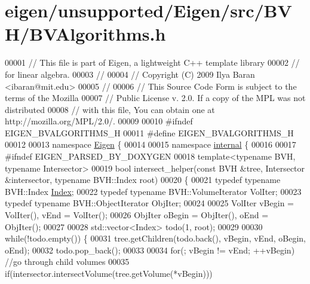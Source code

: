 \hypertarget{eigen_2unsupported_2_eigen_2src_2_b_v_h_2_b_v_algorithms_8h_source}{}\section{eigen/unsupported/\+Eigen/src/\+B\+V\+H/\+B\+V\+Algorithms.h}
\label{eigen_2unsupported_2_eigen_2src_2_b_v_h_2_b_v_algorithms_8h_source}

\begin{DoxyCode}
00001 \textcolor{comment}{// This file is part of Eigen, a lightweight C++ template library}
00002 \textcolor{comment}{// for linear algebra.}
00003 \textcolor{comment}{//}
00004 \textcolor{comment}{// Copyright (C) 2009 Ilya Baran <ibaran@mit.edu>}
00005 \textcolor{comment}{//}
00006 \textcolor{comment}{// This Source Code Form is subject to the terms of the Mozilla}
00007 \textcolor{comment}{// Public License v. 2.0. If a copy of the MPL was not distributed}
00008 \textcolor{comment}{// with this file, You can obtain one at http://mozilla.org/MPL/2.0/.}
00009 
00010 \textcolor{preprocessor}{#ifndef EIGEN\_BVALGORITHMS\_H}
00011 \textcolor{preprocessor}{#define EIGEN\_BVALGORITHMS\_H}
00012 
00013 \textcolor{keyword}{namespace }\hyperlink{namespace_eigen}{Eigen} \{ 
00014 
00015 \textcolor{keyword}{namespace }\hyperlink{namespaceinternal}{internal} \{
00016 
00017 \textcolor{preprocessor}{#ifndef EIGEN\_PARSED\_BY\_DOXYGEN}
00018 \textcolor{keyword}{template}<\textcolor{keyword}{typename} BVH, \textcolor{keyword}{typename} Intersector>
00019 \textcolor{keywordtype}{bool} intersect\_helper(\textcolor{keyword}{const} BVH &tree, Intersector &intersector, \textcolor{keyword}{typename} BVH::Index root)
00020 \{
00021   \textcolor{keyword}{typedef} \textcolor{keyword}{typename} BVH::Index \hyperlink{namespace_eigen_a62e77e0933482dafde8fe197d9a2cfde}{Index};
00022   \textcolor{keyword}{typedef} \textcolor{keyword}{typename} BVH::VolumeIterator VolIter;
00023   \textcolor{keyword}{typedef} \textcolor{keyword}{typename} BVH::ObjectIterator ObjIter;
00024 
00025   VolIter vBegin = VolIter(), vEnd = VolIter();
00026   ObjIter oBegin = ObjIter(), oEnd = ObjIter();
00027 
00028   std::vector<Index> todo(1, root);
00029 
00030   \textcolor{keywordflow}{while}(!todo.empty()) \{
00031     tree.getChildren(todo.back(), vBegin, vEnd, oBegin, oEnd);
00032     todo.pop\_back();
00033 
00034     \textcolor{keywordflow}{for}(; vBegin != vEnd; ++vBegin) \textcolor{comment}{//go through child volumes}
00035       \textcolor{keywordflow}{if}(intersector.intersectVolume(tree.getVolume(*vBegin)))

\end{DoxyCode}
